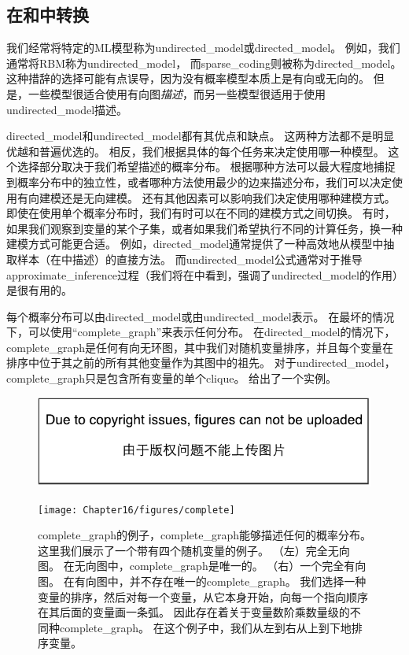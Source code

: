 \subsection{在和中转换}
\label{sec:converting_between_undirected_and_directed_graphs}

我们经常将特定的\gls{ML}模型称为\gls{undirected_model}或\gls{directed_model}。
例如，我们通常将\gls{RBM}称为\gls{undirected_model}， 而\gls{sparse_coding}则被称为\gls{directed_model}。
这种措辞的选择可能有点误导，因为没有概率模型本质上是有向或无向的。
但是，一些模型很适合使用有向图\emph{描述}，而另一些模型很适用于使用\gls{undirected_model}描述。

\gls{directed_model}和\gls{undirected_model}都有其优点和缺点。
这两种方法都不是明显优越和普遍优选的。
相反，我们根据具体的每个任务来决定使用哪一种模型。 
这个选择部分取决于我们希望描述的概率分布。
根据哪种方法可以最大程度地捕捉到概率分布中的独立性，或者哪种方法使用最少的边来描述分布，我们可以决定使用有向建模还是无向建模。
还有其他因素可以影响我们决定使用哪种建模方式。 
即使在使用单个概率分布时，我们有时可以在不同的建模方式之间切换。
有时，如果我们观察到变量的某个子集，或者如果我们希望执行不同的计算任务，换一种建模方式可能更合适。
例如，\gls{directed_model}通常提供了一种高效地从模型中抽取样本（在中描述）的直接方法。
而\gls{undirected_model}公式通常对于推导\gls{approximate_inference}过程（我们将在中看到，强调了\gls{undirected_model}的作用）是很有用的。


每个概率分布可以由\gls{directed_model}或由\gls{undirected_model}表示。
在最坏的情况下，可以使用``\gls{complete_graph}''来表示任何分布。
在\gls{directed_model}的情况下，\gls{complete_graph}是任何有向无环图，其中我们对随机变量排序，并且每个变量在排序中位于其之前的所有其他变量作为其图中的祖先。
对于\gls{undirected_model}，\gls{complete_graph}只是包含所有变量的单个\gls{clique}。 
给出了一个实例。

\begin{figure}[!htb]
\ifOpenSource
\centerline{\includegraphics{figure.pdf}}
\else
	\centerline{\texttt{[image: Chapter16/figures/complete]}}	
\fi
\caption{\gls{complete_graph}的例子，\gls{complete_graph}能够描述任何的概率分布。
这里我们展示了一个带有四个随机变量的例子。
（左）完全无向图。
在无向图中，\gls{complete_graph}是唯一的。
（右）一个完全有向图。
在有向图中，并不存在唯一的\gls{complete_graph}。
我们选择一种变量的排序，然后对每一个变量，从它本身开始，向每一个指向顺序在其后面的变量画一条弧。
因此存在着关于变量数阶乘数量级的不同种\gls{complete_graph}。
在这个例子中，我们从左到右从上到下地排序变量。}
	\label{fig:complete}
\end{figure}



